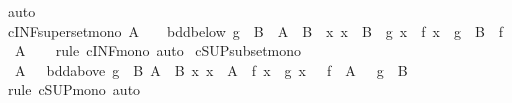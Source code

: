 \begin{isabellebody}
\ auto%
\endisatagproof
{\isafoldproof}%
%
\isadelimproof
\isanewline
%
\endisadelimproof
\isanewline
{}\isamarkupfalse%
\ cINF{\isacharunderscore}{\kern0pt}superset{\isacharunderscore}{\kern0pt}mono{\isacharcolon}{\kern0pt}\ {\isachardoublequoteopen}A\ {\isasymnoteq}\ {\isacharbraceleft}{\kern0pt}{\isacharbraceright}{\kern0pt}\ {\isasymLongrightarrow}\ bdd{\isacharunderscore}{\kern0pt}below\ {\isacharparenleft}{\kern0pt}g\ {\isacharbackquote}{\kern0pt}\ B{\isacharparenright}{\kern0pt}\ {\isasymLongrightarrow}\ A\ {\isasymsubseteq}\ B\ {\isasymLongrightarrow}\ {\isacharparenleft}{\kern0pt}{\isasymAnd}x{\isachardot}{\kern0pt}\ x\ {\isasymin}\ B\ {\isasymLongrightarrow}\ g\ x\ {\isasymle}\ f\ x{\isacharparenright}{\kern0pt}\ {\isasymLongrightarrow}\ {\isasymSqinter}{\isacharparenleft}{\kern0pt}g\ {\isacharbackquote}{\kern0pt}\ B{\isacharparenright}{\kern0pt}\ {\isasymle}\ {\isasymSqinter}{\isacharparenleft}{\kern0pt}f\ {\isacharbackquote}{\kern0pt}\ A{\isacharparenright}{\kern0pt}{\isachardoublequoteclose}\isanewline
%
\isadelimproof
\ \ %
\endisadelimproof
%
\isatagproof
{}\isamarkupfalse%
\ {\isacharparenleft}{\kern0pt}rule\ cINF{\isacharunderscore}{\kern0pt}mono{\isacharparenright}{\kern0pt}\ auto%
\endisatagproof
{\isafoldproof}%
%
\isadelimproof
\isanewline
%
\endisadelimproof
\isanewline
{}\isamarkupfalse%
\ cSUP{\isacharunderscore}{\kern0pt}subset{\isacharunderscore}{\kern0pt}mono{\isacharcolon}{\kern0pt}\ \isanewline
\ \ {\isachardoublequoteopen}{\isasymlbrakk}A\ {\isasymnoteq}\ {\isacharbraceleft}{\kern0pt}{\isacharbraceright}{\kern0pt}{\isacharsemicolon}{\kern0pt}\ bdd{\isacharunderscore}{\kern0pt}above\ {\isacharparenleft}{\kern0pt}g\ {\isacharbackquote}{\kern0pt}\ B{\isacharparenright}{\kern0pt}{\isacharsemicolon}{\kern0pt}\ A\ {\isasymsubseteq}\ B{\isacharsemicolon}{\kern0pt}\ {\isasymAnd}x{\isachardot}{\kern0pt}\ x\ {\isasymin}\ A\ {\isasymLongrightarrow}\ f\ x\ {\isasymle}\ g\ x{\isasymrbrakk}\ {\isasymLongrightarrow}\ {\isasymSqunion}\ {\isacharparenleft}{\kern0pt}f\ {\isacharbackquote}{\kern0pt}\ A{\isacharparenright}{\kern0pt}\ {\isasymle}\ {\isasymSqunion}\ {\isacharparenleft}{\kern0pt}g\ {\isacharbackquote}{\kern0pt}\ B{\isacharparenright}{\kern0pt}{\isachardoublequoteclose}\isanewline
%
\isadelimproof
\ \ %
\endisadelimproof
%
\isatagproof
{}\isamarkupfalse%
\ {\isacharparenleft}{\kern0pt}rule\ cSUP{\isacharunderscore}{\kern0pt}mono{\isacharparenright}{\kern0pt}\ auto%
\endisatagproof
{\isafoldproof}%
%
\isadelimproof
\isanewline
%
\endisadelimproof
\isanewline
{}\isamarkupfalse%

\end{isabellebody}
